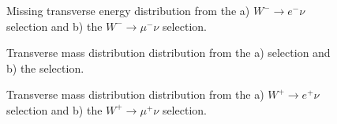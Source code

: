 \begin{figure}[h]
\begin{minipage}[h]{0.49\linewidth}
\end{minipage}
\hfill
\begin{minipage}[h]{0.49\linewidth}
\end{minipage}

\caption{Missing transverse energy distribution from the a) $W^{-} \to e^{-} \nu$ selection and  b) the $W^{-} \to \mu^{-} \nu$ selection.}
\end{figure}


\begin{figure}[h]
\begin{minipage}[h]{0.49\linewidth}
\end{minipage}
\hfill
\begin{minipage}[h]{0.49\linewidth}
\end{minipage}

\caption{Transverse mass distribution distribution from the a) \wenu selection and  b) the \wmunu selection.}
\end{figure}

\begin{figure}[h]
\begin{minipage}[h]{0.49\linewidth}
\end{minipage}
\hfill
\begin{minipage}[h]{0.49\linewidth}
\end{minipage}

\caption{Transverse mass distribution distribution from the a) $W^{+} \to e^{+} \nu$ selection and  b) the $W^{+} \to \mu^{+} \nu$ selection.}
\end{figure}

